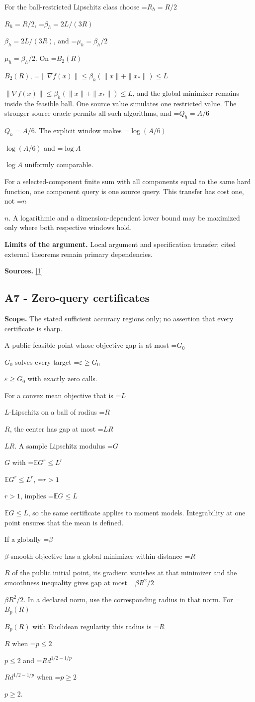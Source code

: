\documentclass[10pt,a4paper]{article}
\newcommand{\AtlasMath}[1]{\par\begingroup\centering\setbox0=\hbox{$\displaystyle #1$}\ifdim\wd0>1.4\linewidth\typeout{ATLAS WIDE FORMULA: \the\wd0}\fi\ifdim\wd0>\linewidth\resizebox{\linewidth}{!}{\box0}\else\box0\fi\par\endgroup}
\newcommand{\AtlasInlineMath}[1]{\begingroup\setbox0=\hbox{$#1$}\ifdim\wd0>.4\linewidth\endgroup\AtlasMath{#1}\else\endgroup$#1$\fi}
\begin{document}
For the ball-restricted Lipschitz class choose \AtlasInlineMath{R_h=R/2}, \AtlasInlineMath{\beta_h=2L/(3R)}, and \AtlasInlineMath{\mu_h=\beta_h/2}. On \AtlasInlineMath{B_2(R)}, \AtlasInlineMath{\|\nabla f(x)\|\le\beta_h(\|x\|+\|x_*\|)\le L}, and the global minimizer remains inside the feasible ball. One source value simulates one restricted value. The stronger source oracle permits all such algorithms, and \AtlasInlineMath{Q_h=A/6}. The explicit window makes \AtlasInlineMath{\log(A/6)} and \AtlasInlineMath{\log A} uniformly comparable.

For a selected-component finite sum with all components equal to the same hard function, one component query is one source query. This transfer has cost one, not \AtlasInlineMath{n}. A logarithmic and a dimension-dependent lower bound may be maximized only where both respective windows hold.

\textbf{Limits of the argument.} Local argument and specification transfer; cited external theorems remain primary dependencies.

\textbf{Sources.} \href{https://arxiv.org/html/2610.00345v1}{[1]}

\subsection{A7 - Zero-query certificates}
\textbf{Scope.} The stated sufficient accuracy regions only; no assertion that every certificate is sharp.

A public feasible point whose objective gap is at most \AtlasInlineMath{G_0} solves every target \AtlasInlineMath{\varepsilon\ge G_0} with exactly zero calls.

For a convex mean objective that is \AtlasInlineMath{L}-Lipschitz on a ball of radius \AtlasInlineMath{R}, the center has gap at most \AtlasInlineMath{LR}. A sample Lipschitz modulus \AtlasInlineMath{G} with \AtlasInlineMath{\mathbb E G^r\le L^r}, \AtlasInlineMath{r>1}, implies \AtlasInlineMath{\mathbb E G\le L}, so the same certificate applies to moment models. Integrability at one point ensures that the mean is defined.

If a globally \AtlasInlineMath{\beta}-smooth objective has a global minimizer within distance \AtlasInlineMath{R} of the public initial point, its gradient vanishes at that minimizer and the smoothness inequality gives gap at most \AtlasInlineMath{\beta R^2/2}. In a declared norm, use the corresponding radius in that norm. For \AtlasInlineMath{B_p(R)} with Euclidean regularity this radius is \AtlasInlineMath{R} when \AtlasInlineMath{p\le2} and \AtlasInlineMath{R d^{1/2-1/p}} when \AtlasInlineMath{p\ge2}.
\end{document}
